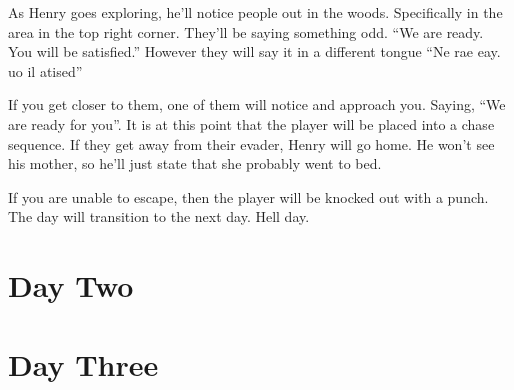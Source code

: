 \documentclass[12pt, a4paper, titlepage]{article}
\begin{document}
            As Henry goes exploring, he'll notice people out in the woods. Specifically in the area in the top right corner. They'll be saying something odd. ``We are ready. You will be 			   satisfied.'' However they will say it in a different tongue ``Ne rae eay. uo il atised''
            
            If you get closer to them, one of them will notice and approach you. Saying, ``We are ready for you''. It is at this point that the player will be placed into a chase sequence. If they 
            get away from their evader, Henry will go home. He won't see his mother, so he'll just state that she probably went to bed.
            
            If you are unable to escape, then the player will be knocked out with a punch. The day will transition to the next day. Hell day.
            
    \section{Day Two}
    
    \section{Day Three}
\end{document}
